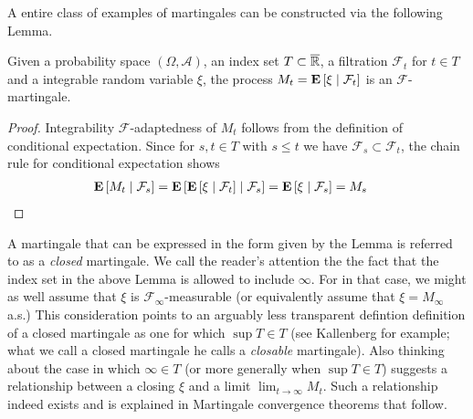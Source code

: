 A entire class of examples of martingales can be constructed via the
following Lemma.  
\begin{lem}\label{ClosedMartingales}Given a probability space $(\Omega,  \mathcal{A})$, an
  index set $T \subset \overline{\reals}$, a
  filtration $\mathcal{F}_t$ for $t \in T$ and a integrable random
  variable $\xi$, the process $M_t = \cexpectationlong{\mathcal{F}_t}{\xi}$ is
  an $\mathcal{F}$-martingale.
\end{lem}
\begin{proof}Integrability $\mathcal{F}$-adaptedness of $M_t$ follows from the definition of
  conditional expectation.  Since for $s,t \in T$ with $s \leq t$ we
  have $\mathcal{F}_s \subset \mathcal{F}_t$, the chain rule for
  conditional expectation shows 
\begin{align*}
\cexpectationlong{\mathcal{F}_s}{M_t} &=
\cexpectationlong{\mathcal{F}_s}{\cexpectationlong{\mathcal{F}_t}{\xi}} =
\cexpectationlong{\mathcal{F}_s}{\xi} = M_s
\end{align*}
\end{proof}
A martingale that can be expressed in the form given by the Lemma is
referred to as a \emph{closed} martingale.  We call the reader's attention the the fact
that the index set in the above Lemma is allowed to include $\infty$.
For in that case, we might as well assume that $\xi$ is
$\mathcal{F}_\infty$-measurable (or equivalently assume that $\xi =
M_\infty$ a.s.)  This consideration points to an
arguably less transparent defintion
definition of a closed martingale as one for which $\sup T \in T$ (see
Kallenberg for example; what we call a closed martingale he calls a
\emph{closable} martingale).  Also thinking about the case  in which
$\infty \in T$ (or more generally when $\sup T \in T$) suggests a
relationship between a closing $\xi$ and a limit $\lim_{t \to \infty}
M_t$.  Such a relationship indeed exists and is explained in
Martingale convergence theorems that follow.

